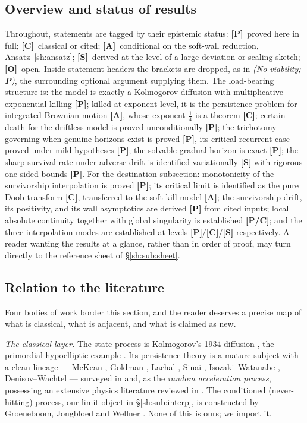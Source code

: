 \documentclass[11pt]{article}
\numberwithin{equation}{section}
\theoremstyle{plain}
\theoremstyle{definition}
\theoremstyle{remark}
\begin{document}
\subsection*{Overview and status of results}

Throughout, statements are tagged by their epistemic status:
\textbf{[P]}~proved here in full; \textbf{[C]}~classical or cited;
\textbf{[A]}~conditional on the soft-wall reduction, Ansatz~\ref{sh:ansatz};
\textbf{[S]}~derived at the level of a large-deviation or scaling sketch;
\textbf{[O]}~open. Inside statement headers the brackets are dropped, as
in \emph{(No viability; \textbf{P})}, the surrounding optional argument
supplying them. The load-bearing structure is:
the model is exactly a Kolmogorov diffusion with multiplicative-exponential
killing \textbf{[P]}; killed at exponent level, it is the persistence problem
for integrated Brownian motion \textbf{[A]}, whose exponent $\tfrac14$ is a
theorem \textbf{[C]}; certain death for the driftless model is proved
unconditionally \textbf{[P]}; the trichotomy governing when genuine horizons
exist is proved \textbf{[P]}, its critical recurrent case proved under mild
hypotheses \textbf{[P]}; the solvable gradual horizon is exact \textbf{[P]};
the sharp survival rate under adverse drift is identified variationally
\textbf{[S]} with rigorous one-sided bounds \textbf{[P]}. For the
destination subsection: monotonicity of the survivorship interpolation is
proved \textbf{[P]}; its critical limit is identified as the pure Doob
transform \textbf{[C]}, transferred to the soft-kill model \textbf{[A]};
the survivorship drift, its positivity, and its wall asymptotics are
derived \textbf{[P]} from cited inputs; local absolute
continuity together with global singularity is established
\textbf{[P/C]}; and
the three interpolation modes are established at levels
\textbf{[P]}/\textbf{[C]}/\textbf{[S]} respectively. A reader wanting the
results at a glance, rather than in order of proof, may turn directly to
the reference sheet of \S\ref{sh:sub:sheet}.

\subsection*{Relation to the literature}

Four bodies of work border this section, and the reader deserves a
precise map of what is classical, what is adjacent, and what is claimed
as new.

\emph{The classical layer.} The state process is Kolmogorov's 1934
diffusion \cite{Kol34}, the primordial hypoelliptic example
\cite{Hor67}. Its persistence theory is a mature subject with a clean
lineage --- McKean \cite{McK63}, Goldman \cite{Gol71}, Lachal
\cite{Lac91}, Sinai \cite{Sin92}, Isozaki--Watanabe \cite{IW94},
Denisov--Wachtel \cite{DW15} --- surveyed in \cite{AS15} and, as the
\emph{random acceleration process}, possessing an extensive physics
literature reviewed in \cite{BMS13}. The conditioned (never-hitting)
process, our limit object in \S\ref{sh:sub:interp}, is constructed by
Groeneboom, Jongbloed and Wellner \cite{GJW99}. None of this is ours;
we import it.
\end{document}
